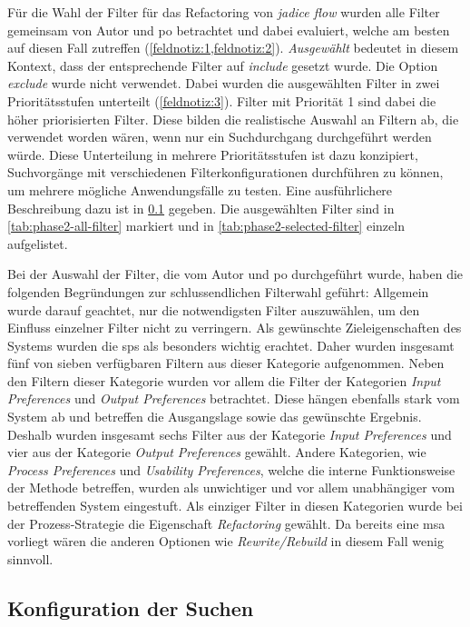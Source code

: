 Für die Wahl der Filter für das Refactoring von \emph{jadice flow} wurden alle Filter gemeinsam von Autor und \gls{po} betrachtet und dabei evaluiert, welche am besten auf diesen Fall zutreffen (\cref{feldnotiz:1,feldnotiz:2}).
\emph{Ausgewählt} bedeutet in diesem Kontext, dass der entsprechende Filter auf \emph{include} gesetzt wurde.
Die Option \emph{exclude} wurde nicht verwendet.
Dabei wurden die ausgewählten Filter in zwei Prioritätsstufen unterteilt (\cref{feldnotiz:3}).
Filter mit Priorität 1 sind dabei die höher priorisierten Filter.
Diese bilden die realistische Auswahl an Filtern ab, die verwendet worden wären, wenn nur ein Suchdurchgang durchgeführt werden würde.
Diese Unterteilung in mehrere Prioritätsstufen ist dazu konzipiert, Suchvorgänge mit verschiedenen Filterkonfigurationen durchführen zu können, um mehrere mögliche Anwendungsfälle zu testen.
Eine ausführlichere Beschreibung dazu ist in \cref{sec:phase2-suchconfig} gegeben.
Die ausgewählten Filter sind in \cref{tab:phase2-all-filter} markiert und in \cref{tab:phase2-selected-filter} einzeln aufgelistet.



Bei der Auswahl der Filter, die vom Autor und \gls{po} durchgeführt wurde, haben die folgenden Begründungen zur schlussendlichen Filterwahl geführt:
Allgemein wurde darauf geachtet, nur die notwendigsten Filter auszuwählen, um den Einfluss einzelner Filter nicht zu verringern.
Als gewünschte Zieleigenschaften des Systems wurden die \glspl{sp} als besonders wichtig erachtet.
Daher wurden insgesamt fünf von sieben verfügbaren Filtern aus dieser Kategorie aufgenommen.
Neben den Filtern dieser Kategorie wurden vor allem die Filter der Kategorien \emph{Input Preferences} und \emph{Output Preferences} betrachtet.
Diese hängen ebenfalls stark vom System ab und betreffen die Ausgangslage sowie das gewünschte Ergebnis.
Deshalb wurden insgesamt sechs Filter aus der Kategorie \emph{Input Preferences} und vier aus der Kategorie \emph{Output Preferences} gewählt.
Andere Kategorien, wie \emph{Process Preferences} und \emph{Usability Preferences}, welche die interne Funktionsweise der Methode betreffen, wurden als unwichtiger und vor allem unabhängiger vom betreffenden System eingestuft.
Als einziger Filter in diesen Kategorien wurde bei der Prozess-Strategie die Eigenschaft \emph{Refactoring} gewählt.
Da bereits eine \gls{msa} vorliegt wären die anderen Optionen wie \emph{Rewrite/Rebuild} in diesem Fall wenig sinnvoll.

\subsection{Konfiguration der Suchen}
\label{sec:phase2-suchconfig}

